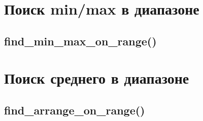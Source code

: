 \documentclass[12pt, a4paper]{article}
\begin{document}







\section{Поиск min/max в диапазоне}

\subsection{find\_min\_max\_on\_range()}







\section{Поиск среднего в диапазоне}



\subsection{find\_arrange\_on\_range()}






\label{link:lastPage}
\end{document}
